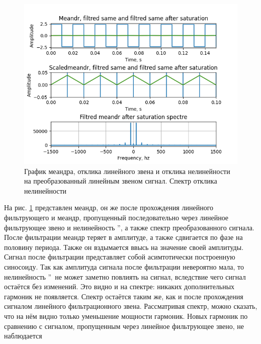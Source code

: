 \begin{figure}[H]
	\centering
	\includegraphics[width=1.05\linewidth]{body/images/filtred-meandr-after-saturation-and-its-spectre.png}
	\caption{График меандра, отклика линейного звена и отклика нелинейности на преобразованный
	линейным звеном сигнал. Спектр отклика нелинейности}
	\label{fig:38}
\end{figure}

На рис. \ref{fig:38} представлен меандр, он же после прохождения
линейного фильтрующего и меандр, пропущенный последовательно через линейное
фильтрующее звено и нелинейность \textquotedblright,
а также спектр преобразованного сигнала. После фильтрации меандр теряет в амплитуде,
а также сдвигается по фазе на половину периода. Также он вздымается ввысь на значение
своей амплитуды. Сигнал после фильтрации представляет собой асимтотически построенную
синосоиду. Так как амплитуда сигнала после фильтрации невероятно мала, то
нелинейность \textquotedblright\ не может заметно повлиять
на сигнал, вследствие чего сигнал остаётся без изменений. Это видно и на спектре:
никаких дополнительных гармоник не появляется. Спектр остаётся таким же, как и после
прохождения сигналом линейного фильтрационного звена. Рассматривая спектр, можно
сказать, что на нём видно только уменьшение мощности гармоник. Новых гармоник по
сравнению с сигналом, пропущенным через линейное фильтрующее звено, не наблюдается

